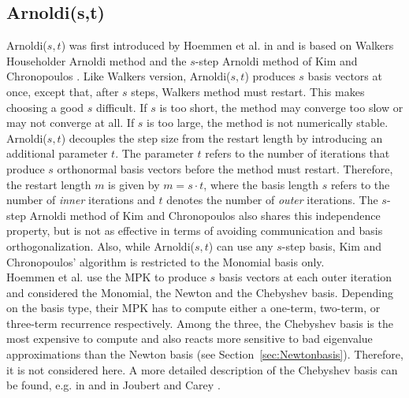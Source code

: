 \documentclass{scrartcl}
\numberwithin{equation}{section}
\begin{document}
\subsection{Arnoldi(s,t)}
Arnoldi($s,t$) was first introduced by Hoemmen et al. in \cite{Hoemmen:2010:CKS:1970638} and is based on Walkers Householder Arnoldi method \cite{doi:10.1137/Walker} and the $s$-step Arnoldi method of Kim and Chronopoulos \cite{Chronopoulos}. Like Walkers version, Arnoldi($s,t$) produces $s$ basis vectors at once, except that, after $s$ steps, Walkers method must restart. This makes choosing a good $s$ difficult. If $s$ is too short, the method may converge too slow or may not converge at all. If $s$ is too large, the method is not numerically stable.\\ Arnoldi($s,t$) decouples the step size from the restart length by introducing an additional parameter $t$. The parameter $t$ refers to the number of iterations that produce $s$ orthonormal basis vectors before the method must restart. Therefore, the restart length $m$ is given by $m = s \cdot t$, where the basis length $s$ refers to the number of \textit{inner} iterations and $t$ denotes the number of \textit{outer} iterations.
The $s$-step Arnoldi method of Kim and Chronopoulos also shares this independence property, but is not as effective in terms of avoiding communication and basis orthogonalization. Also, while Arnoldi($s,t$) can use any $s$-step basis, Kim and Chronopoulos' algorithm is restricted to the Monomial basis only.\\
Hoemmen et al. \cite{Hoemmen:2010:CKS:1970638} use the MPK to produce  $s$ basis vectors at each outer iteration and considered the Monomial, the Newton and the Chebyshev basis. Depending on the basis type, their MPK has to compute either a one-term, two-term, or three-term recurrence respectively. Among the three, the Chebyshev basis is the most expensive to compute and also reacts more sensitive to bad eigenvalue approximations than the Newton basis (see Section~\ref{sec:Newtonbasis}). Therefore, it is not considered here. A more detailed description of the Chebyshev basis can be found, e.g. in \cite{Hoemmen:2010:CKS:1970638} and in Joubert and Carey \cite{Joubert_Carey_Chebyshev}.
\end{document}
